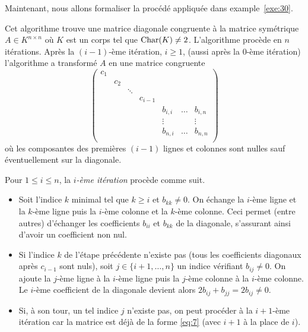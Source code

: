 Maintenant, nous allons formaliser la procédé appliquée dans example~\ref{exe:30}. 
\begin{algorithm}
  \label{alg:1}
  Cet algorithme trouve une matrice diagonale congruente à la matrice symétrique $A \in K^{n \times n}$ où $K$ est un corps tel que $\mathrm{Char}(K) \neq 2$.  L'algorithme procède en $n$ itérations. Après la $(i-1)$-ème itération, $i \geq 1$, (aussi après  la $0$-ème itération) l'algorithme a transformé $A$ en une matrice congruente 
  \begin{equation}
    \label{eq:7}
    \begin{pmatrix}
      c_1 \\
      & c_2 \\
      & & \ddots & &&\\
      & & & c_{i-1} \\
      & & & &  b_{i,i} & \dots & b_{i,n} \\
      & & & &     \vdots       &  & \vdots \\
      & & & &  b_{n,i} & \dots & b_{n,n} \\      
    \end{pmatrix}
  \end{equation}
où les composantes des premières $(i-1)$ lignes et colonnes sont nulles sauf éventuellement sur la diagonale. 

\medskip 
\noindent 
Pour $1 \leq i \leq n$, la \emph{$i$-ème itération} procède comme suit. 
\begin{itemize}
 \item Soit l'indice $k$ minimal tel que $k \geq i$ et $b_{kk} \neq 0$. On échange la $i$-ème ligne et la $k$-ème ligne puis la $i$-ème colonne et la $k$-ème colonne. Ceci permet (entre autres) d'échanger les coefficients $b_{ii}$ et $b_{kk}$ de la diagonale, s'assurant ainsi d'avoir un coefficient non nul. 
 
 \item Si l'indice $k$ de l'étape précédente n'existe pas (tous les coefficients diagonaux après $c_{i-1}$ sont nuls), soit $j \in \{i+1,\dots,n\}$ un indice vérifiant $b_{ij} \neq 0$. On ajoute la $j$-ème ligne à la $i$-ème ligne puis la $j$-ème colonne à la $i$-ème colonne. Le $i$-ème coefficient de la diagonale devient alors $2 b_{ij} + b_{jj} = 2 b_{ij} \neq 0$.
 
 \item Si, à son tour, un tel indice $j$ n'existe pas, on peut procéder à la $i+1$-ème itération car la matrice est déjà de la forme \eqref{eq:7} (avec $i+1$ à la place de $i$).
  

\end{itemize}
\end{algorithm}
